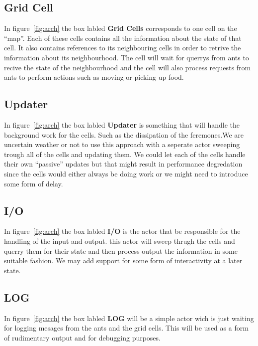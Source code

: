 \documentclass[a4paper]{article}
\begin{document}
\subsection{Grid Cell}
In figure~\ref{fig:arch} the box labled \textbf{Grid Cells} corresponds to one
cell on the ``map''. Each of these cells contains all the information about the state of
that cell. It also contains references to its neighbouring cells in order to
retrive the information about its neighbourhood. The cell will wait for querrys
from ants to recive the state of the neighbourhood and the cell will also
process requests from ants to perform actions such as moving or picking up food.

\subsection{Updater}
In figure~\ref{fig:arch} the box labled \textbf{Updater} is something that will
handle the background work for the cells. Such as the dissipation of the feremones.We
are uncertain weather or not to use this approach with a seperate actor sweeping
trough all of the cells and updating them. We could let each of the cells handle
their own ``passive'' updates but that might result in performance degredation
since the cells would either always be doing work or we might need to introduce
some form of delay.

\subsection{I/O}
In figure~\ref{fig:arch} the box labled \textbf{I/O} is the actor that be
responsible for the handling of the input and output. this actor will sweep thrugh the cells and
querry them for their state and then process output the information in some
suitable fashion. We may add support for some form of interactivity at a later
state.

\subsection{LOG}
In figure~\ref{fig:arch} the box labled \textbf{LOG} will be a simple actor wich
is just waiting for logging mesages from the ants and the grid cells. This will be
used as a form of rudimentary output and for debugging purposes.
\end{document}

